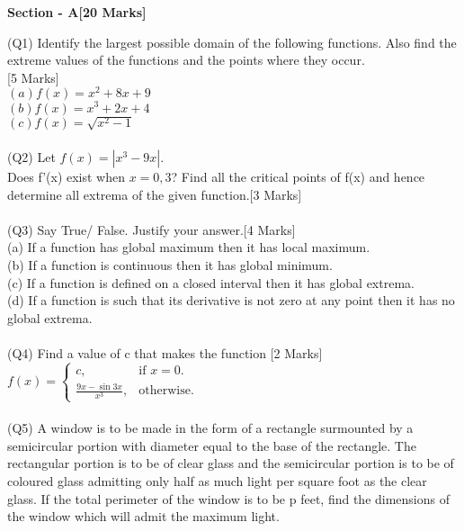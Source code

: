 \documentclass[12pt]{article}
\begin{document}
{		\newpage
		\begin{center}
			\textbf{Section - A\hspace*{8cm}[20 Marks]}   
		\end{center}
		(Q1)  Identify the largest possible domain of the following functions. Also find the extreme values of the functions and the points where they occur.
		\\\hspace*{12cm}[5 Marks]
		\\$(a)f(x) = x^2 + 8x + 9 $\\
		$(b)f(x) = x^{3} +{2x} + 4 $ \\
		$(c)f(x) = \sqrt{x^2-1}$
		\\\\(Q2) Let $f(x) = |x^{3}-9x|$. 
		\\Does f'(x) exist when $x = 0,3$? Find all the critical points of f(x) and hence determine all extrema of the given function.\hspace*{4cm}[3 Marks]
		\\\\(Q3)  Say True/ False. Justify your answer.\hspace*{4cm}[4 Marks]
		\\(a) If a function has global maximum then it has local maximum.
		\\(b) If a function is continuous then it has global minimum.
		\\(c) If a function is defined on a closed interval then it has global extrema.
		\\(d) If a function is such that its derivative is not zero at any point then it has no global extrema.
		\\\\(Q4) Find a value of c that makes the function \hspace*{3cm}[2 Marks]\\
		\begin{math}
			f(x)=\left\{
			\begin{array}{ll}
				c ,  & \mbox{if $x=0$}.\\
				\frac{9x - \sin 3x}{x^3}, & \mbox{otherwise}.
			\end{array}
			\right.
		\end{math}
		\\\\(Q5) A window is to be made in the form of a rectangle surmounted by a semicircular portion with diameter equal to the base of the rectangle. The rectangular portion is to be of clear glass and the semicircular portion is to be of coloured glass admitting only half as much light per square foot as the clear glass. If the total perimeter of the window is to be p feet, find the dimensions of the window which will admit the maximum light.
}
\end{document}
